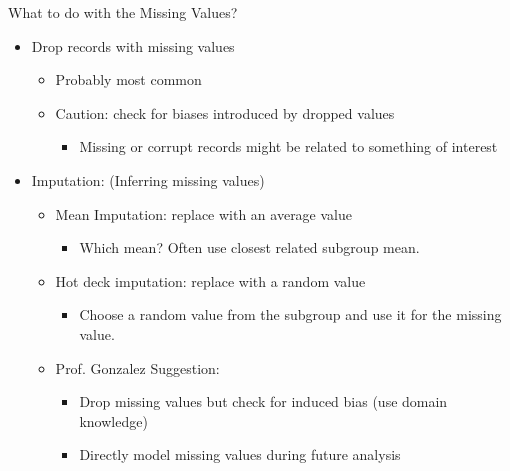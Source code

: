 \documentclass[aspectratio=169]{../latex_main/tntbeamer}  %
\begin{document}
	\begin{frame}{What to do with the Missing Values?}
	    \begin{itemize}
	        \item Drop records with missing values
	        \begin{itemize}
	            \item Probably most common
	            \item Caution: check for biases introduced by dropped values
	            \begin{itemize}
	                \item Missing or corrupt records might be related to something of interest
	            \end{itemize}
	        \end{itemize}
	        \item Imputation: (Inferring missing values)
            \begin{itemize}
                \item Mean Imputation: replace with an average value 
                \begin{itemize}
                    \item Which mean?  Often use closest related subgroup mean.
                \end{itemize}
                \item Hot deck imputation: replace with a random value
                \begin{itemize}
                    \item Choose a random value from the subgroup and use it for the missing value.
                \end{itemize}
                \item Prof. Gonzalez Suggestion: 
                \begin{itemize}
                    \item Drop missing values but check for induced bias (use domain knowledge)
                    \item Directly model missing values during future analysis
                \end{itemize}
            \end{itemize}
            
	    \end{itemize}
	\end{frame}
	
	
	
\end{document}
